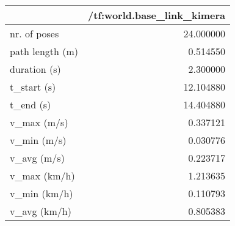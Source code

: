 \begin{tabular}{lr}
\toprule
{} &  /tf:world.base\_link\_kimera \\
\midrule
nr. of poses    &                   24.000000 \\
path length (m) &                    0.514550 \\
duration (s)    &                    2.300000 \\
t\_start (s)     &                   12.104880 \\
t\_end (s)       &                   14.404880 \\
v\_max (m/s)     &                    0.337121 \\
v\_min (m/s)     &                    0.030776 \\
v\_avg (m/s)     &                    0.223717 \\
v\_max (km/h)    &                    1.213635 \\
v\_min (km/h)    &                    0.110793 \\
v\_avg (km/h)    &                    0.805383 \\
\bottomrule
\end{tabular}
